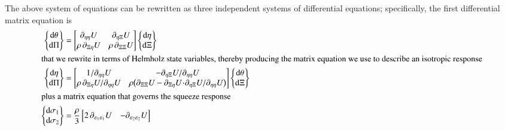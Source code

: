 The above system of equations can be rewritten as three independent systems of differential equations; specifically, the first differential matrix equation is
\begin{subequations}
    \label{hypoelastic3D}
    \begin{align}
    \left\{ \begin{matrix}
    \mathrm{d} \theta \\ \mathrm{d} \Pi
    \end{matrix} \right\} & = \begin{bmatrix}
    \partial_{\eta\eta} U & \partial_{\eta\Xi} U \\
    \rho \, \partial_{\Xi\eta} U & \rho \, \partial_{\Xi\Xi} U  
    \end{bmatrix}
    \left\{ \begin{matrix}
    \mathrm{d}\eta \\ \mathrm{d} \Xi 
    \end{matrix} \right\} \notag \\
    \intertext{that we rewrite in terms of Helmholz state variables, thereby producing the matrix equation we use to describe an isotropic response}
    \left\{ \begin{matrix}
    \mathrm{d} \eta \\ \mathrm{d} \Pi 
    \end{matrix} \right\} & = \begin{bmatrix}
    1 / \partial_{\eta\eta} U & -\partial_{\eta\Xi} U / \partial_{\eta\eta} U \\ 
    \rho \, \partial_{\Xi\eta} U / \partial_{\eta\eta} U & 
    \rho \bigl( \partial_{\Xi\Xi} U - \partial_{\Xi\eta} U \!\cdot\! \partial_{\eta\Xi} U / \partial_{\eta\eta} U \bigr)
    \end{bmatrix}
    \left\{ \begin{matrix}
    \mathrm{d} \theta \\ \mathrm{d} \Xi
    \end{matrix} \right\}
    \label{Helmholtz3Disotropic} \\
    \intertext{plus a matrix equation that governs the squeeze response}
    \left\{ \begin{matrix}
    \mathrm{d} \sigma_1 \\ \mathrm{d} \sigma_2 
    \end{matrix} \right\} & = \frac{\rho}{3} \begin{bmatrix}
    2 \, \partial_{\varepsilon_1 \varepsilon_1} U & - \partial_{\varepsilon_2 \varepsilon_2} U \\

\end{bmatrix}
\end{align}
\end{subequations}
